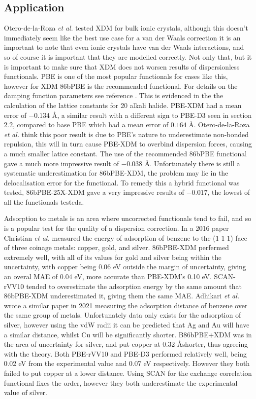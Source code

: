 \documentclass[10pt,a4paper,twocolumn,twoside]{extarticle}
\newcommand{\al}{\emph{et al. }}
\newcommand{\oA}{\si{\angstrom}}
\begin{document}
	\subsection{Application}
	Otero-de-la-Roza \al tested XDM for bulk ionic crystals\cite{Roza-2020-XDM}, although this doesn't immediately seem like the best use case for a van der Waals correction it is an important to note that even ionic crystals have van der Waals interactions, and so of course it is important that they are modelled correctly. Not only that, but it is important to make sure that XDM does not worsen results of dispersionless functionals. PBE is one of the most popular functionals for cases like this, however for XDM 86bPBE is the recommended functional. For details on the damping function parameters see reference \cite{PBE-underbinding}. This is evidenced in the the calculation of the lattice constants for 20 alkali halide. PBE-XDM had a mean error of $-0.134$ \oA, a similar result with a different sign to PBE-D3 seen in section 2.2, compared to base PBE which had a mean error of  $0.164$ \oA. Otero-de-la-Roza \al think this poor result is due to PBE's nature to underestimate non-bonded repulsion\cite{PBE-underbinding}, this will in turn cause PBE-XDM to overbind dispersion forces, causing a much smaller latice constant. The use of the recommended 86bPBE functional gave a much more impressive result of $-0.038$ \oA. Unfortunately there is still a systematic underestimation for 86bPBE-XDM, the problem may lie in the delocalisation error for the functional\cite{86bPBE-delocalisation}. To remedy this a hybrid functional was tested, 86bPBE-25X-XDM gave a very impressive results of $-0.017$, the lowest of all the functionals testeda\cite{Roza-2020-XDM}. 

	Adsorption to metals is an area where uncorrected functionals tend to fail, and so is a popular test for the quality of a dispersion correction. In a 2016 paper Christian \al measured\cite{Christian2016-CoinageAdsorption} the energy of adsorption of benzene to the (1 1 1) face of three coinage metals: copper, gold, and silver. 86bPBE-XDM perfermed extremely well, with all of its values for gold and silver being within the uncertainty, with copper being 0.06 eV outside the margin of uncertainty, giving an overal MAE of  0.04 eV, more accurate than PBE-XDM's 0.10 eV. SCAN-rVV10 tended to overestimate the adsorption energy by the same amount that 86bPBE-XDM underestimated it, giving them the same MAE. Adhikari \al wrote a similar paper in 2021 \cite{VV10-Adsorption} measuring the adsorption distance of benzene over the same group of metals. Unfortunately data only exists for the adsorption of silver, however using the vdW radii it can be predicted that Ag and Au will have a similar distance, whilst Cu will be significantly shorter. B86bPBE+XDM was in the area of uncertainty for silver, and put copper at 0.32 \oA shorter, thus agreeing with the theory. Both PBE-rVV10 and PBE-D3 performed relatively well, being 0.02 eV from the experimental value and 0.07 eV respectively. However they both failed to put copper at a lower distance. Using SCAN for the exchange correlation functional fixes the order, however they both underestimate the experimental value of silver. 
\end{document}
